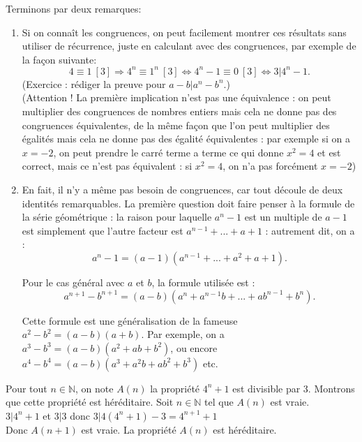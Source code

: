 \begin{Soln}{30}
Terminons par deux remarques:
\begin{enumerate}
\item Si on connaît les congruences, on peut facilement montrer ces résultats sans utiliser de récurrence, juste en calculant avec des congruences, par exemple de la façon suivante:
\[
4\equiv 1 ~[3]
\Rightarrow 4^n\equiv 1^n~[3]
\Leftrightarrow 4^n-1\equiv 0~[3]
\Leftrightarrow 3 | 4^n-1.
\]
(Exercice : rédiger la preuve pour $a-b | a^n-b^n$.)\\
(Attention ! La première implication n'est pas une équivalence : on peut multiplier des congruences de nombres entiers mais cela ne donne pas des congruences équivalentes, de la même façon que l'on peut multiplier des égalités mais cela ne donne pas des égalité équivalentes : par exemple si on a $x=-2$, on peut prendre le carré terme a terme ce qui donne $x^2=4$ et est correct, mais ce n'est pas équivalent : si $x^2=4$, on n'a pas forcément $x=-2$)

\item En fait, il n'y a même pas besoin de congruences, car tout découle de deux identités remarquables. La première question doit faire penser à la formule de la série géométrique : la raison pour laquelle $a^n-1$ est un multiple de $a-1$ est simplement que l'autre facteur est $a^{n-1}+...+a+1$ : autrement dit, on a :
\[ a^n-1 = (a-1)(a^{n-1}+...+a^2+a+1).\]

Pour le cas général avec $a$ et $b$, la formule utilisée est :
\[ a^{n+1}-b^{n+1} = (a-b)(a^n+a^{n-1}b+...+ab^{n-1}+b^n).\]

Cette formule est une généralisation de la fameuse $a^2-b^2=(a-b)(a+b)$. Par exemple, on a $a^3-b^3=(a-b)(a^2+ab+b^2)$, ou encore  $a^4-b^4=(a-b)(a^3+a^2b+ab^2+b^3)$ etc.

\end{enumerate}
\end{Soln}
\begin{Soln}{31}
Pour tout $n \in \mathbb{N}$, on note $A(n)$ la propriété \og$4^n+1$ est divisible par 3\fg. Montrons que cette propriété est héréditaire.
Soit $n \in \mathbb{N}$ tel que $A(n)$ est vraie. \\
$3|4^n+1$ et $3|3$ donc $3|4(4^n+1)-3 = 4^{n+1}+1$\\
Donc $A(n+1)$ est vraie. La propriété $A(n)$ est héréditaire.
\end{Soln}
